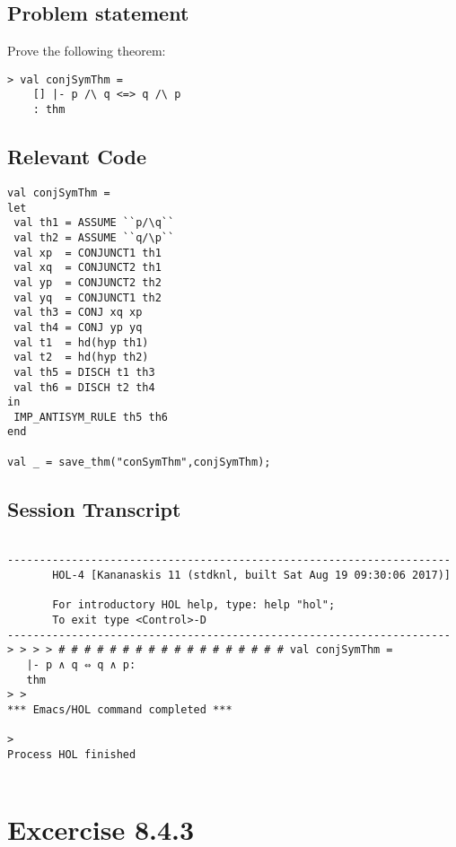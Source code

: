 \documentclass{report}
\begin{document}
\section{Problem statement}
\label{problem-statement-8-4-2}
Prove the following theorem:
\begin{lstlisting}[frame=tblr]
> val conjSymThm =
	[] |- p /\ q <=> q /\ p
	: thm
\end{lstlisting}
\section{Relevant Code}
\label{rel-code-8-4-2}
\begin{lstlisting}[frame=TBlr]
val conjSymThm =
let
 val th1 = ASSUME ``p/\q``
 val th2 = ASSUME ``q/\p``
 val xp  = CONJUNCT1 th1
 val xq  = CONJUNCT2 th1
 val yp  = CONJUNCT2 th2
 val yq  = CONJUNCT1 th2
 val th3 = CONJ xq xp
 val th4 = CONJ yp yq
 val t1  = hd(hyp th1)
 val t2  = hd(hyp th2)
 val th5 = DISCH t1 th3
 val th6 = DISCH t2 th4
in
 IMP_ANTISYM_RULE th5 th6
end

val _ = save_thm("conSymThm",conjSymThm);

\end{lstlisting}

\section{Session Transcript}
\label{trans-8-4-2}

\begin{session}
  \begin{scriptsize}
\begin{verbatim}

---------------------------------------------------------------------
       HOL-4 [Kananaskis 11 (stdknl, built Sat Aug 19 09:30:06 2017)]

       For introductory HOL help, type: help "hol";
       To exit type <Control>-D
---------------------------------------------------------------------
> > > > # # # # # # # # # # # # # # # # # # val conjSymThm =
   |- p ∧ q ⇔ q ∧ p:
   thm
> > 
*** Emacs/HOL command completed ***

> 
Process HOL finished


\end{verbatim}
  \end{scriptsize}
\end{session}



\chapter{Excercise 8.4.3}
\label{cha:8.4.3}
\end{document}
